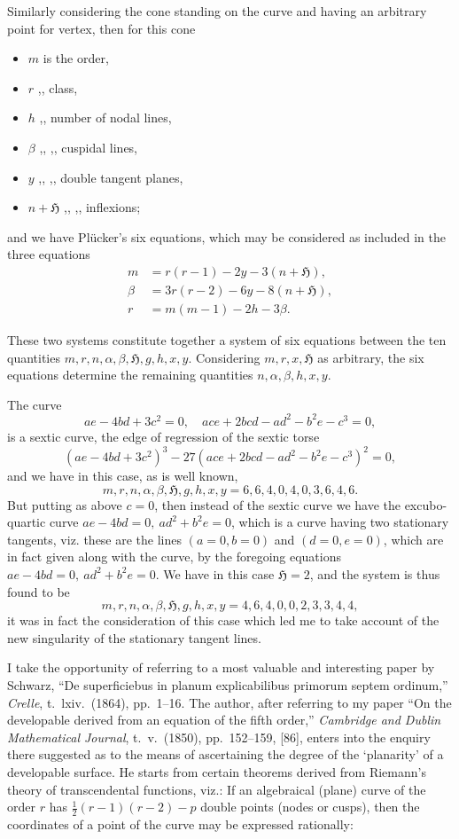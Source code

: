 \documentclass[11pt]{article}
\begin{document}
Similarly considering the cone standing on the curve and having an arbitrary point for vertex, then for this cone
\begin{itemize}\setlength{\itemsep}{0pt}
\item[] $m$ is the order,
\item[] $r$ ,, class,
\item[] $h$ ,, number of nodal lines,
\item[] $\beta$ ,, ,, cuspidal lines,
\item[] $y$ ,, ,, double tangent planes,
\item[] $n + \mathfrak{H}$ ,, ,, inflexions;
\end{itemize}
and we have Pl\"ucker's six equations, which may be considered as included in the three equations
\begin{align*}
m &= r(r - 1) - 2y - 3(n + \mathfrak{H}),\\
\beta &= 3r(r - 2) - 6y - 8(n + \mathfrak{H}),\\
r &= m(m - 1) - 2h - 3\beta.
\end{align*}

These two systems constitute together a system of six equations between the ten quantities $m, r, n, \alpha, \beta, \mathfrak{H}, g, h, x, y$. Considering $m, r, x, \mathfrak{H}$ as arbitrary, the six equations determine the remaining quantities $n, \alpha, \beta, h, x, y$.

The curve
\[ ae - 4bd + 3c^2 = 0,\quad ace + 2bcd - ad^2 - b^2 e - c^3 = 0, \]
is a sextic curve, the edge of regression of the sextic torse
\[ (ae - 4bd + 3c^2)^3 - 27(ace + 2bcd - ad^2 - b^2 e - c^3)^2 = 0, \]
and we have in this case, as is well known,
\[ m, r, n, \alpha, \beta, \mathfrak{H}, g, h, x, y = 6, 6, 4, 0, 4, 0, 3, 6, 4, 6. \]
But putting as above $c = 0$, then instead of the sextic curve we have the excubo-quartic curve $ae - 4bd = 0,\ ad^2 + b^2 e = 0$, which is a curve having two stationary tangents, viz. these are the lines $(a=0, b=0)$ and $(d=0, e=0)$, which are in fact given along with the curve, by the foregoing equations $ae - 4bd = 0,\ ad^2 + b^2 e = 0$. We have in this case $\mathfrak{H} = 2$, and the system is thus found to be
\[ m, r, n, \alpha, \beta, \mathfrak{H}, g, h, x, y = 4, 6, 4, 0, 0, 2, 3, 3, 4, 4, \]
it was in fact the consideration of this case which led me to take account of the new singularity of the stationary tangent lines.

I take the opportunity of referring to a most valuable and interesting paper by Schwarz, ``De superficiebus in planum explicabilibus primorum septem ordinum,'' \emph{Crelle}, t.~lxiv.~(1864), pp.~1--16. The author, after referring to my paper ``On the developable derived from an equation of the fifth order,'' \emph{Cambridge and Dublin Mathematical Journal}, t.~v.~(1850), pp.~152--159, [86], enters into the enquiry there suggested as to the means of ascertaining the degree of the `planarity' of a developable surface. He starts from certain theorems derived from Riemann's theory of transcendental functions, viz.: If an algebraical (plane) curve of the order $r$ has $\tfrac{1}{2}(r-1)(r-2) - p$ double points (nodes or cusps), then the coordinates of a point of the curve may be expressed rationally:
\end{document}
